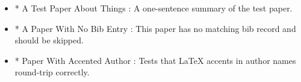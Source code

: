 \documentclass{article}
\begin{document}
\begin{itemize}
  \item * A Test Paper About Things \cite{TestPaper2024}:
  A one-sentence summary of the test paper.

  \item * A Paper With No Bib Entry \cite{MissingBib2024}:
  This paper has no matching bib record and should be skipped.

  \item * Paper With Accented Author \cite{AccentPaper2023}:
  Tests that LaTeX accents in author names round-trip correctly.
\end{itemize}
\end{document}

